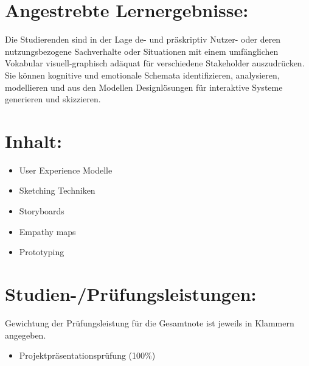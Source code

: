 \section*{Angestrebte
Lernergebnisse:\label{/mi-2017/modulbeschreibungen-master/MA_HCI_Sketching_and_Designing_for_User_Experience}}\label{angestrebte-lernergebnissepathlabelmi-2017modulbeschreibungen-mastermaux5fhciux5fsketchingux5fandux5fdesigningux5fforux5fuserux5fexperience}

Die Studierenden sind in der Lage de- und präskriptiv Nutzer- oder deren
nutzungsbezogene Sachverhalte oder Situationen mit einem umfänglichen
Vokabular visuell-graphisch adäquat für verschiedene Stakeholder
auszudrücken. Sie können kognitive und emotionale Schemata
identifizieren, analysieren, modellieren und aus den Modellen
Designlösungen für interaktive Systeme generieren und skizzieren.

\section*{Inhalt:\label{/mi-2017/modulbeschreibungen-master/MA_HCI_Sketching_and_Designing_for_User_Experience}}\label{inhaltpathlabelmi-2017modulbeschreibungen-mastermaux5fhciux5fsketchingux5fandux5fdesigningux5fforux5fuserux5fexperience}

\begin{itemize}
\tightlist
\item
  User Experience Modelle
\item
  Sketching Techniken
\item
  Storyboards
\item
  Empathy maps
\item
  Prototyping
\end{itemize}

\section*{Studien-/Prüfungsleistungen:\label{/mi-2017/modulbeschreibungen-master/MA_HCI_Sketching_and_Designing_for_User_Experience}}\label{studien-pruxfcfungsleistungenpathlabelmi-2017modulbeschreibungen-mastermaux5fhciux5fsketchingux5fandux5fdesigningux5fforux5fuserux5fexperience}

Gewichtung der Prüfungsleistung für die Gesamtnote ist jeweils in
Klammern angegeben.

\begin{itemize}
\tightlist
\item
  Projektpräsentationsprüfung (100\%)
\end{itemize}

